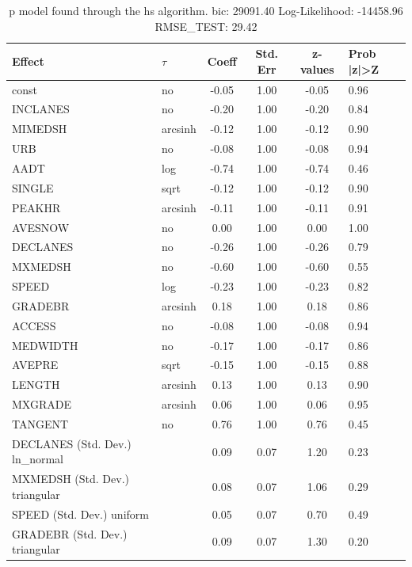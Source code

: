 \begin{table}
	\caption{p model found through the hs algorithm. bic: 29091.40 Log-Likelihood: -14458.96 RMSE_TEST: 29.42}
	\begin{center}
		\begin{tabular}{|l|l|c|c|c|l|}
			\hline
			Effect & $\tau$ & Coeff & Std. Err & z-values & Prob |z|>Z \\
			\hline
			const & no & -0.05 & 1.00 & -0.05 & 0.96 \\
			\hline
			INCLANES & no & -0.20 & 1.00 & -0.20 & 0.84 \\
			\hline
			MIMEDSH & arcsinh & -0.12 & 1.00 & -0.12 & 0.90 \\
			\hline
			URB & no & -0.08 & 1.00 & -0.08 & 0.94 \\
			\hline
			AADT & log & -0.74 & 1.00 & -0.74 & 0.46 \\
			\hline
			SINGLE & sqrt & -0.12 & 1.00 & -0.12 & 0.90 \\
			\hline
			PEAKHR & arcsinh & -0.11 & 1.00 & -0.11 & 0.91 \\
			\hline
			AVESNOW & no & 0.00 & 1.00 & 0.00 & 1.00 \\
			\hline
			DECLANES & no & -0.26 & 1.00 & -0.26 & 0.79 \\
			\hline
			MXMEDSH & no & -0.60 & 1.00 & -0.60 & 0.55 \\
			\hline
			SPEED & log & -0.23 & 1.00 & -0.23 & 0.82 \\
			\hline
			GRADEBR & arcsinh & 0.18 & 1.00 & 0.18 & 0.86 \\
			\hline
			ACCESS & no & -0.08 & 1.00 & -0.08 & 0.94 \\
			\hline
			MEDWIDTH & no & -0.17 & 1.00 & -0.17 & 0.86 \\
			\hline
			AVEPRE & sqrt & -0.15 & 1.00 & -0.15 & 0.88 \\
			\hline
			LENGTH & arcsinh & 0.13 & 1.00 & 0.13 & 0.90 \\
			\hline
			MXGRADE & arcsinh & 0.06 & 1.00 & 0.06 & 0.95 \\
			\hline
			TANGENT & no & 0.76 & 1.00 & 0.76 & 0.45 \\
			\hline
			DECLANES (Std. Dev.) ln_normal &  & 0.09 & 0.07 & 1.20 & 0.23 \\
			\hline
			MXMEDSH (Std. Dev.) triangular &  & 0.08 & 0.07 & 1.06 & 0.29 \\
			\hline
			SPEED (Std. Dev.) uniform &  & 0.05 & 0.07 & 0.70 & 0.49 \\
			\hline
			GRADEBR (Std. Dev.) triangular &  & 0.09 & 0.07 & 1.30 & 0.20 \\

\end{tabular}
\end{center}
\end{table}

